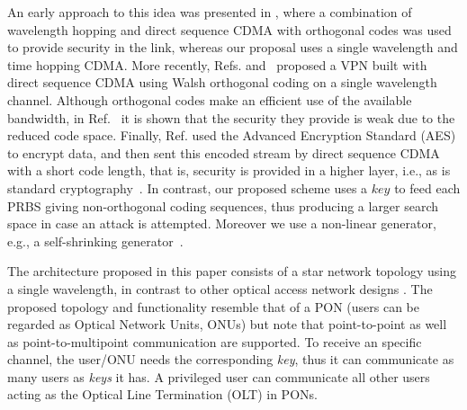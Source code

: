 \documentclass[10pt]{article}
\begin{document}
An early approach to this idea was presented in \cite{Tancevski:95},
where a combination of wavelength hopping and direct sequence CDMA
with orthogonal codes was used to provide security in the link, whereas our proposal uses a single wavelength and time hopping CDMA.
More recently, Refs. \cite{Nadarajah2006} and~\cite{Nirmalathas2009} proposed a VPN built with direct sequence CDMA using Walsh orthogonal coding on a single wavelength channel.
Although orthogonal codes make an efficient use of the available
bandwidth, in Ref.~\cite{Shake:05} it is shown that the security they
provide is weak due to the reduced code space.
Finally, Ref. \cite{Wang:10} used the Advanced Encryption Standard (AES)
to encrypt data, and then sent this encoded stream by direct sequence CDMA with
a short code length, that is, security is provided in a higher
layer, i.e., as is standard cryptography~\cite{Shake:05}.
In contrast, our proposed scheme uses a $key$ to feed each PRBS giving
 non-orthogonal coding sequences, thus producing a larger search space
in case an attack is attempted. Moreover we use a non-linear generator,
e.g., a self-shrinking generator~\cite{Meier:94}.


The architecture proposed in this paper consists of a star network
topology using a single wavelength, in contrast to other optical access network designs \cite{journals/jsac/CarenaFFGNPP04}.
The proposed topology and functionality resemble that of a PON (users
can be regarded as Optical Network Units, ONUs) but note that
point-to-point as well as point-to-multipoint communication are
supported. 
To receive an specific channel, the user/ONU needs the corresponding
{\em key}, thus it can communicate as many users as {\em keys} it has.
A privileged user can communicate all other users acting as the Optical Line Termination (OLT) in PONs.
\end{document}
